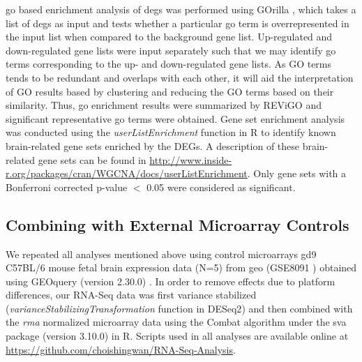 \gls{go} based enrichment analysis of \glspl{deg} was performed using GOrilla \citep{Eden2009}, which takes a list of \glspl{deg} as input and tests whether a particular \gls{go} term is overrepresented in the input list when compared to the background gene list.
Up-regulated and down-regulated gene lists were input separately such that we may identify \gls{go} terms corresponding to the up- and down-regulated gene lists.
As GO terms tends to be redundant and overlaps with each other, it will aid the interpretation of GO results based by clustering and reducing the GO terms based on their similarity. 
Thus, \gls{go} enrichment results were summarized by REViGO \citep{Supek2011} and significant representative \gls{go} terms were obtained.
Gene set enrichment analysis was conducted using the \textit{userListEnrichment} \citep{Miller2011} function in R to identify known brain-related gene sets enriched by the DEGs.
A description of these brain-related gene sets can be found in \url{http://www.inside-r.org/packages/cran/WGCNA/docs/userListEnrichment}.
Only gene sets with a Bonferroni corrected p-value $<$ 0.05 were considered as significant. 

\subsection{Combining with External Microarray Controls}
We repeated all analyses mentioned above using control microarrays \gls{gd}9 C57BL/6 mouse fetal brain expression data (N=5) from \gls{geo} (GSE8091 \citep{Hartl2008}) obtained using GEOquery (version 2.30.0) \citep{Davis2007}.
In order to remove effects due to platform differences, our RNA-Seq data was first variance stabilized (\textit{varianceStabilizingTransformation} function in DESeq2\cite{Anders2010}) and then combined with the \textit{rma} normalized microarray data using the Combat algorithm \citep{Johnson2007} under the sva package (version 3.10.0) in R.
Scripts used in all analyses are available online at \url{https://github.com/choishingwan/RNA-Seq-Analysis}. 

